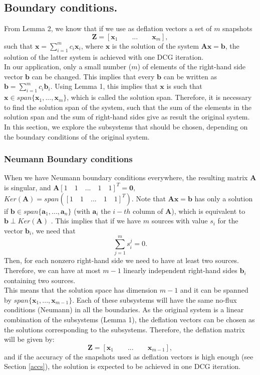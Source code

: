 \documentclass[12pt]{article}
\begin{document}
\subsection{Boundary conditions.}
From Lemma 2, we know that if we use as deflation vectors a set of $m$ snapshots $$\mathbf{Z}=[\mathbf{x}_1\qquad ...\qquad \mathbf{x}_m],$$ such that $\mathbf{x}=\sum_{i=1}^m {c}_i\mathbf{x}_i$, where $\mathbf{x}$ is the solution of the system $\mathbf{A}\mathbf{x}=\mathbf{b}$, the solution of the latter system is achieved with one DCG iteration. \\
In our application, only a small number ($m$) of elements of the right-hand side vector $\mathbf{b}$
can be changed. This implies that every $\mathbf{b}$ can be written as $\mathbf{b}=\sum_{i=1}^m {c}_i\mathbf{b}_i.$ Using Lemma 1, this implies that $\mathbf{x}$ is such that 
$\mathbf{x}\in span\{ \mathbf{x}_1, ...,  \mathbf{x}_m\}$, which is called the solution span.
Therefore, it is necessary to find the solution span of the system, such that the sum of the elements in the solution span and the sum of right-hand sides give as result the original system. In this section, we explore the subsystems that should be chosen, depending on the boundary conditions of the original system. 
\subsubsection*{{Neumann Boundary conditions}}
When we have Neumann boundary conditions everywhere, the resulting matrix $\mathbf{A}$ is singular, and
$\mathbf{A}[1\quad 1\quad ...\quad 1\quad 1]^T=\mathbf{0},$ $Ker(\mathbf{A})=span([1\quad 1\quad ...\quad 1\quad 1]^T)$. 
Note that $\mathbf{A}\mathbf{x}=\mathbf{b}$ has only a solution if $\mathbf{b}\in span\{\mathbf{a}_1,...,\mathbf{a}_n\}$ (with $\mathbf{a}_i$ the $i-th$ column of $\mathbf{A}$), which is equivalent to $\mathbf{b}\perp Ker(\mathbf{A}) $ \cite{Strang09}.
This implies that if we have $m$ sources with value ${s}_i$ for the vector $\mathbf{b}_i$, we need that 
$$\sum_{j=1}^ m {s}^{j}_i=0.$$
Then, for each nonzero  right-hand side we need to have at least two sources. Therefore, we can have at most $m-1$ linearly independent right-hand sides $\mathbf{b}_{i}$ containing two sources.\\
This means that the solution space has dimension $m-1$ and it can be spanned by $ span\{\mathbf{x}_1,...,\mathbf{x}_{m-1}\}$.
Each of these subsystems will have the same no-flux conditions (Neumann) in all the boundaries.
As the original system is a linear combination of the subsystems (Lemma 1), the deflation vectors can be chosen as the solutions corresponding to the subsystems. Therefore, the deflation matrix will be given by:
$$\mathbf{Z}=[\mathbf{x}_1\qquad ...\qquad \mathbf{x}_{m-1}],$$
and if the accuracy of the snapshots used as deflation vectors is high enough (see Section \ref{accs}), the solution is expected to be achieved in one DCG iteration. 
\end{document}
